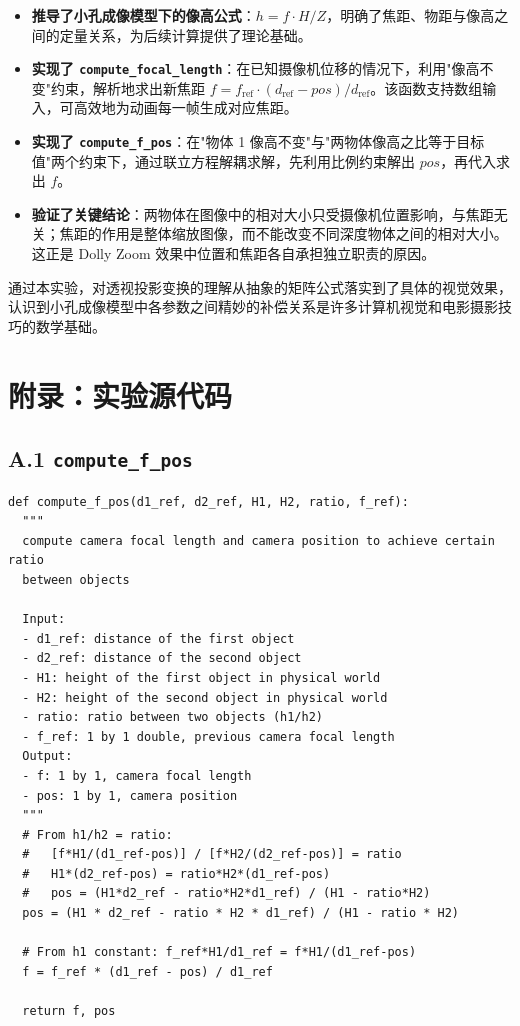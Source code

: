 \documentclass[12pt,a4paper]{ctexart}
\begin{document}
\begin{itemize}
  \item \textbf{推导了小孔成像模型下的像高公式}：$h = f \cdot H / Z$，明确了焦距、物距与像高之间的定量关系，为后续计算提供了理论基础。
  \item \textbf{实现了 \texttt{compute\_focal\_length}}：在已知摄像机位移的情况下，利用"像高不变"约束，解析地求出新焦距 $f = f_\text{ref} \cdot (d_\text{ref} - pos) / d_\text{ref}$。该函数支持数组输入，可高效地为动画每一帧生成对应焦距。
  \item \textbf{实现了 \texttt{compute\_f\_pos}}：在"物体 1 像高不变"与"两物体像高之比等于目标值"两个约束下，通过联立方程解耦求解，先利用比例约束解出 $pos$，再代入求出 $f$。
  \item \textbf{验证了关键结论}：两物体在图像中的相对大小只受摄像机位置影响，与焦距无关；焦距的作用是整体缩放图像，而不能改变不同深度物体之间的相对大小。这正是 Dolly Zoom 效果中位置和焦距各自承担独立职责的原因。
\end{itemize}

通过本实验，对透视投影变换的理解从抽象的矩阵公式落实到了具体的视觉效果，认识到小孔成像模型中各参数之间精妙的补偿关系是许多计算机视觉和电影摄影技巧的数学基础。

\section*{附录：实验源代码}

\subsection*{A.1 \texttt{compute\_f\_pos}}

\begin{lstlisting}
def compute_f_pos(d1_ref, d2_ref, H1, H2, ratio, f_ref):
  """
  compute camera focal length and camera position to achieve certain ratio
  between objects

  Input:
  - d1_ref: distance of the first object
  - d2_ref: distance of the second object
  - H1: height of the first object in physical world
  - H2: height of the second object in physical world
  - ratio: ratio between two objects (h1/h2)
  - f_ref: 1 by 1 double, previous camera focal length
  Output:
  - f: 1 by 1, camera focal length
  - pos: 1 by 1, camera position
  """
  # From h1/h2 = ratio:
  #   [f*H1/(d1_ref-pos)] / [f*H2/(d2_ref-pos)] = ratio
  #   H1*(d2_ref-pos) = ratio*H2*(d1_ref-pos)
  #   pos = (H1*d2_ref - ratio*H2*d1_ref) / (H1 - ratio*H2)
  pos = (H1 * d2_ref - ratio * H2 * d1_ref) / (H1 - ratio * H2)

  # From h1 constant: f_ref*H1/d1_ref = f*H1/(d1_ref-pos)
  f = f_ref * (d1_ref - pos) / d1_ref

  return f, pos
\end{lstlisting}
\end{document}
